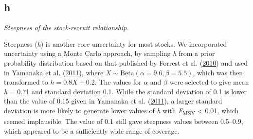 \documentclass[11pt]{book}
\newenvironment{Shaded}{}{}
\newcommand{\KeywordTok}[1]{\textcolor[rgb]{0.00,0.44,0.13}{\textbf{{#1}}}}
\newcommand{\DecValTok}[1]{\textcolor[rgb]{0.25,0.63,0.44}{{#1}}}
\newcommand{\FloatTok}[1]{\textcolor[rgb]{0.25,0.63,0.44}{{#1}}}
\newcommand{\StringTok}[1]{\textcolor[rgb]{0.25,0.44,0.63}{{#1}}}
\newcommand{\CommentTok}[1]{\textcolor[rgb]{0.38,0.63,0.69}{\textit{{#1}}}}
\newcommand{\NormalTok}[1]{{#1}}
\newcommand{\OperatorTok}[1]{\textcolor[rgb]{0.00,0.44,0.13}{\textbf{{#1}}}}
\newcommand{\ControlFlowTok}[1]{\textcolor[rgb]{0.00,0.44,0.13}{\textbf{{#1}}}}
\begin{document}
\subsection{h}

\emph{Steepness of the stock-recruit relationship.}

Steepness (\emph{h}) is another core uncertainty for most stocks. We incorporated uncertainty using a Monte Carlo approach, by sampling \emph{h} from a prior probability distribution based on that published by Forrest et al. (\protect\hyperlink{ref-forrest2010}{2010}) and used in Yamanaka et al. (\protect\hyperlink{ref-yamanaka2011}{2011}), where \(X \sim \textrm{Beta}(\alpha = 9.6, \beta = 5.5)\), which was then transformed to \(h = 0.8 X + 0.2\). The values for \(\alpha\) and \(\beta\) were selected to give mean \emph{h} = 0.71 and standard deviation 0.1. While the standard deviation of 0.1 is lower than the value of 0.15 given in Yamanaka et al. (\protect\hyperlink{ref-yamanaka2011}{2011}), a larger standard deviation is more likely to generate lower values of \emph{h} with \emph{F}\textsubscript{MSY} \textless{} 0.01, which seemed implausible. The value of 0.1 still gave steepness values between 0.5--0.9, which appeared to be a sufficiently wide range of coverage.
\begin{Shaded}
\end{Shaded}
\end{document}

